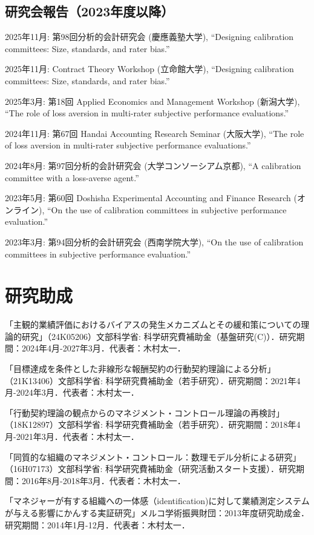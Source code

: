 \documentclass[letterpaper,11pt]{article}
\renewenvironment{itemize}{
  \begin{list}{}{
    \setlength{\leftmargin}{1.5em}
  }
}{
  \end{list}
}
\begin{document}
\subsection*{研究会報告（2023年度以降）}

\begin{itemize}
    \item 2025年11月: 第98回分析的会計研究会 (慶應義塾大学),  ``Designing calibration committees: Size, standards, and rater bias.''
    \item 2025年11月: Contract Theory Workshop (立命館大学), ``Designing calibration committees: Size, standards, and rater bias.''
    \item 2025年3月: 第18回 Applied Economics and Management Workshop (新潟大学), ``The role of loss aversion in multi-rater subjective performance evaluations.''
    \item 2024年11月: 第67回 Handai Accounting Research Seminar (大阪大学), ``The role of loss aversion in multi-rater subjective performance evaluations.''
    \item 2024年8月: 第97回分析的会計研究会 (大学コンソーシアム京都),  ``A calibration committee with a loss-averse agent.''
    \item 2023年5月: 第60回 Doshisha Experimental Accounting and Finance Research (オンライン), ``On the use of calibration committees in subjective performance evaluation.''
    \item 2023年3月: 第94回分析的会計研究会 (西南学院大学), ``On the use of calibration committees in subjective performance evaluation.''
\end{itemize}

\section*{研究助成}

\begin{itemize}
\item 「主観的業績評価におけるバイアスの発生メカニズムとその緩和策についての理論的研究」（24K05206）文部科学省: 科学研究費補助金（基盤研究(C)）．研究期間：2024年4月-2027年3月．代表者：木村太一．

\item 「目標達成を条件とした非線形な報酬契約の行動契約理論による分析」（21K13406）文部科学省: 科学研究費補助金（若手研究）．研究期間：2021年4月-2024年3月．代表者：木村太一．

\item 「行動契約理論の観点からのマネジメント・コントロール理論の再検討」（18K12897）文部科学省: 科学研究費補助金（若手研究）．研究期間：2018年4月-2021年3月．代表者：木村太一．

\item 「同質的な組織のマネジメント・コントロール：数理モデル分析による研究」（16H07173）文部科学省: 科学研究費補助金（研究活動スタート支援）．研究期間：2016年8月-2018年3月．代表者：木村太一．

\item 「マネジャーが有する組織への一体感（identification)に対して業績測定システムが与える影響にかんする実証研究」メルコ学術振興財団：2013年度研究助成金．研究期間：2014年1月-12月．代表者：木村太一．
\end{itemize}
\end{document}
